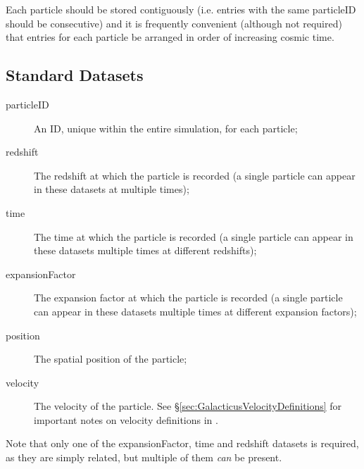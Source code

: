 Each particle should be stored contiguously (i.e. entries with the same {\normalfont \ttfamily particleID} should be consecutive) and it is frequently convenient (although not required) that entries for each particle be arranged in order of increasing cosmic time.

\subsection{Standard Datasets}

\begin{description}
 \item [{\normalfont \ttfamily particleID}] An ID, unique within the entire simulation, for each particle;
 \item [{\normalfont \ttfamily redshift}] The redshift at which the particle is recorded (a single particle can appear in these datasets at multiple times);
 \item [{\normalfont \ttfamily time}] The time at which the particle is recorded (a single particle can appear in these datasets multiple times at different redshifts);
 \item [{\normalfont \ttfamily expansionFactor}] The expansion factor at which the particle is recorded (a single particle can appear in these datasets multiple times at different expansion factors);
 \item [{\normalfont \ttfamily position}] The spatial position of the particle;
 \item [{\normalfont \ttfamily velocity}] The velocity of the particle. See \S\ref{sec:GalacticusVelocityDefinitions} for important notes on velocity definitions in \glc.
\end{description}

Note that only one of the {\normalfont \ttfamily expansionFactor}, {\normalfont \ttfamily time} and {\normalfont \ttfamily redshift} datasets is required, as they are simply related, but multiple of them \emph{can} be present.
